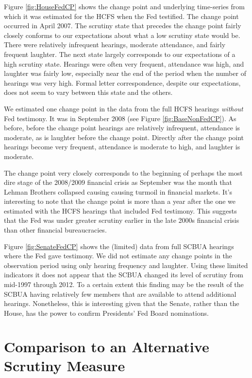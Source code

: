 \documentclass[a4paper]{article}\usepackage[]{graphicx}\usepackage[]{color}
\begin{document}
Figure \ref{fig:HouseFedCP} shows the change point and underlying time-series from which it was estimated for the HCFS when the Fed testified. The change point occurred in April 2007. The scrutiny state that precedes the change point fairly closely conforms to our expectations about what a low scrutiny state would be. There were relatively infrequent hearings, moderate attendance, and fairly frequent laughter. The next state largely corresponds to our expectations of a high scrutiny state. Hearings were often very frequent, attendance was high, and laughter was fairly low, especially near the end of the period when the number of hearings was very high. Formal letter correspondence, despite our expectations, does not seem to vary between this state and the others.

We estimated one change point in the data from the full HCFS hearings \emph{without} Fed testimony. It was in September 2008 (see Figure \ref{fig:BaseNonFedCP}). As before, before the change point hearings are relatively infrequent, attendance is moderate, as is laughter before the change point. Directly after the change point hearings become very frequent, attendance is moderate to high, and laughter is moderate.

The change point very closely corresponds to the beginning of perhaps the most dire stage of the 2008/2009 financial crisis as September was the month that Lehman Brothers collapsed causing causing turmoil in financial markets. It's interesting to note that the change point is more than a year after the one we estimated with the HCFS hearings that included Fed testimony. This suggests that the Fed was under greater scrutiny earlier in the late 2000s financial crisis than other financial bureaucracies.

Figure \ref{fig:SenateFedCP} shows the (limited) data from full SCBUA hearings where the Fed gave testimony. We did not estimate any change points in the observation period using only hearing frequency and laughter. Using these limited indicators it does not appear that the SCBUA changed its level of scrutiny from mid-1997 through 2012. To a certain extent this finding may be the result of the SCBUA having relatively few members that are available to attend additional hearings. Nonetheless, this is interesting given that the Senate, rather than the House, has the power to confirm Presidents' Fed Board nominations.

\section{Comparison to an Alternative Scrutiny Measure}
\end{document}
